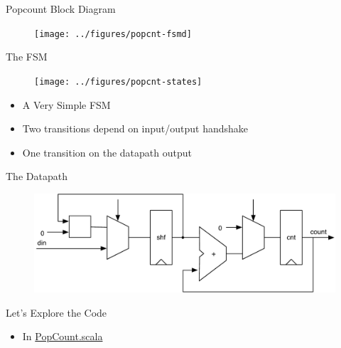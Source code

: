 \begin{frame}[fragile]{Popcount Block Diagram}

\begin{figure}
  \texttt{[image: ../figures/popcnt-fsmd]}
\end{figure}
\end{frame}


\begin{frame}[fragile]{The FSM}
\begin{figure}
  \texttt{[image: ../figures/popcnt-states]}
\end{figure}
\begin{itemize}
\item A Very Simple FSM
\item Two transitions depend on input/output handshake
\item One transition on the datapath output
\end{itemize}
\end{frame}

\begin{frame}[fragile]{The Datapath}
\begin{figure}
  \includegraphics[scale=0.65]{../figures/popcnt-data}
\end{figure}
\end{frame}

\begin{frame}[fragile]{Let's Explore the Code}
\begin{itemize}
\item In \href{https://github.com/schoeberl/chisel-book/blob/master/src/main/scala/PopCount.scala}{PopCount.scala}
\end{itemize}
\end{frame}

